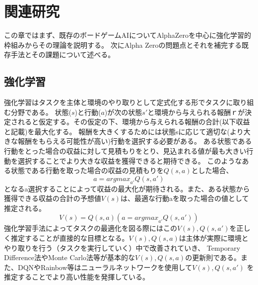 \chapter{関連研究}
この章ではまず、既存のボードゲームAIについてAlphaZeroを中心に強化学習的枠組みからその理論を説明する。
次にAlpha Zeroの問題点とそれを補完する既存手法とその課題について述べる。



\section{強化学習}
強化学習はタスクを主体と環境のやり取りとして定式化する形でタスクに取り組む分野である。
状態($s$)と行動($a$)が次の状態$s'$と環境から与えられる報酬ｒが決定されると仮定する。その仮定の下、環境から与えられる報酬の合計(以下収益と記載)を最大化する。
報酬を大きくするためには状態sに応じて適切な(より大きな報酬をもらえる可能性が高い)行動を選択する必要がある。
ある状態である行動をとった場合の収益に対して見積もりをとり、見込まれる値が最も大きい行動を選択することでより大きな収益を獲得できると期待できる。
このようなある状態である行動を取った場合の収益の見積もりを$Q(s, a)$とした場合、
\begin{equation}
	a = {argmax}_{a'} Q(s, a')
\end{equation}
となるa選択することによって収益の最大化が期待される。また、ある状態から獲得できる収益の合計の予想値$V(s)$は、最適な行動aを取った場合の値として推定される。
\begin{equation}
	V(s) = Q(s, a)(a = {argmax}_{a'} Q(s, a'))
\end{equation}
強化学習手法によってタスクの最適化を図る際にはこの$V(s),Q(s, a')$を正しく推定することが直接的な目標となる。$V(s),Q(s, a)$は主体が実際に環境とやり取りを行う（タスクを実行していく）中で改善されていき、
Temporary Difference法\cite{oord2016wavenet}やMonte Carlo法\cite{oord2016wavenet}等が基本的な$V(s),Q(s, a)$の更新則である。また、DQN\cite{oord2016wavenet}やRainbow\cite{oord2016wavenet}等はニューラルネットワークを使用して$V(s),Q(s, a')$
を推定することでより高い性能を発揮している。



